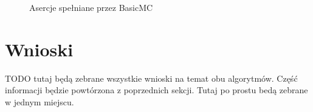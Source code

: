 \documentclass[12pt, a4paper]{article}
\begin{document}
\begin{figure}[H]
  \begin{center}
  \end{center}
  \caption{Asercje spełniane przez BasicMC}
  \label{fig:tests}
\end{figure}


\section{Wnioski}

TODO tutaj będą zebrane wszystkie wnioski na temat obu algorytmów. Część informacji będzie powtórzona z poprzednich sekcji. Tutaj po prostu bedą zebrane w jednym miejscu.


\nocite{*}


\end{document}
